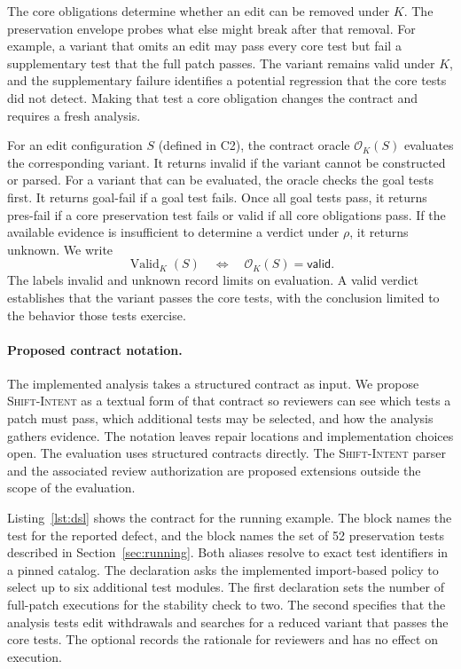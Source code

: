 \documentclass[a4paper,fleqn]{cas-sc}
\newcommand{\dsl}{\textsc{Shift-Intent}}
\newcommand{\code}[1]{\texttt{\detokenize{#1}}}
\newcommand{\lab}[1]{\textsf{#1}}
\newcommand{\Valid}{\operatorname{Valid}}
\begin{document}
The core obligations determine whether an edit can be removed under $K$. The preservation envelope probes what else might break after that removal. For example, a variant that omits an edit may pass every core test but fail a supplementary test that the full patch passes. The variant remains valid under $K$, and the supplementary failure identifies a potential regression that the core tests did not detect. Making that test a core obligation changes the contract and requires a fresh analysis.

For an edit configuration $S$ (defined in C2), the contract oracle $\mathcal{O}_K(S)$ evaluates the corresponding variant. It returns \lab{invalid} if the variant cannot be constructed or parsed. For a variant that can be evaluated, the oracle checks the goal tests first. It returns \lab{goal-fail} if a goal test fails. Once all goal tests pass, it returns \lab{pres-fail} if a core preservation test fails or \lab{valid} if all core obligations pass. If the available evidence is insufficient to determine a verdict under $\rho$, it returns \lab{unknown}. We write \begin{equation} \Valid_K(S)\quad\Longleftrightarrow\quad \mathcal{O}_K(S)=\lab{valid}. \label{eq:valid} \end{equation} The labels \lab{invalid} and \lab{unknown} record limits on evaluation. A \lab{valid} verdict establishes that the variant passes the core tests, with the conclusion limited to the behavior those tests exercise.



\paragraph{Proposed contract notation.} The implemented analysis takes a structured contract as input. We propose \dsl{} as a textual form of that contract so reviewers can see which tests a patch must pass, which additional tests may be selected, and how the analysis gathers evidence. The notation leaves repair locations and implementation choices open. The evaluation uses structured contracts directly. The \dsl{} parser and the associated review authorization are proposed extensions outside the scope of the evaluation.

Listing~\ref{lst:dsl} shows the contract for the running example. The \code{goal} block names the test for the reported defect, and the \code{preserve} block names the set of 52 preservation tests described in Section~\ref{sec:running}. Both aliases resolve to exact test identifiers in a pinned catalog. The \code{envelope} declaration asks the implemented import-based policy to select up to six additional test modules. The first \code{evidence} declaration sets the number of full-patch executions for the stability check to two. The second specifies that the analysis tests edit withdrawals and searches for a reduced variant that passes the core tests. The optional \code{note} records the rationale for reviewers and has no effect on execution.
\end{document}
